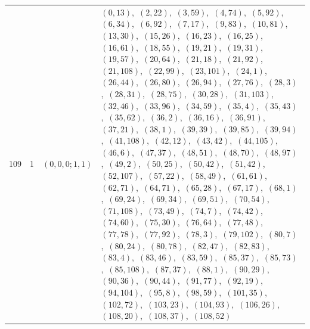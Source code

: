 \documentclass[11pt]{article}
\begin{document}
\begin{longtable}{@{}rrl>{\raggedright\arraybackslash}p{}@{}}
109 & 1 & $(0,0,0;1,1)$ & $(0,13)$,\allowbreak\ $(2,22)$,\allowbreak\ $(3,59)$,\allowbreak\ $(4,74)$,\allowbreak\ $(5,92)$,\allowbreak\ $(6,34)$,\allowbreak\ $(6,92)$,\allowbreak\ $(7,17)$,\allowbreak\ $(9,83)$,\allowbreak\ $(10,81)$,\allowbreak\ $(13,30)$,\allowbreak\ $(15,26)$,\allowbreak\ $(16,23)$,\allowbreak\ $(16,25)$,\allowbreak\ $(16,61)$,\allowbreak\ $(18,55)$,\allowbreak\ $(19,21)$,\allowbreak\ $(19,31)$,\allowbreak\ $(19,57)$,\allowbreak\ $(20,64)$,\allowbreak\ $(21,18)$,\allowbreak\ $(21,92)$,\allowbreak\ $(21,108)$,\allowbreak\ $(22,99)$,\allowbreak\ $(23,101)$,\allowbreak\ $(24,1)$,\allowbreak\ $(26,44)$,\allowbreak\ $(26,80)$,\allowbreak\ $(26,94)$,\allowbreak\ $(27,76)$,\allowbreak\ $(28,3)$,\allowbreak\ $(28,31)$,\allowbreak\ $(28,75)$,\allowbreak\ $(30,28)$,\allowbreak\ $(31,103)$,\allowbreak\ $(32,46)$,\allowbreak\ $(33,96)$,\allowbreak\ $(34,59)$,\allowbreak\ $(35,4)$,\allowbreak\ $(35,43)$,\allowbreak\ $(35,62)$,\allowbreak\ $(36,2)$,\allowbreak\ $(36,16)$,\allowbreak\ $(36,91)$,\allowbreak\ $(37,21)$,\allowbreak\ $(38,1)$,\allowbreak\ $(39,39)$,\allowbreak\ $(39,85)$,\allowbreak\ $(39,94)$,\allowbreak\ $(41,108)$,\allowbreak\ $(42,12)$,\allowbreak\ $(43,42)$,\allowbreak\ $(44,105)$,\allowbreak\ $(46,6)$,\allowbreak\ $(47,37)$,\allowbreak\ $(48,51)$,\allowbreak\ $(48,70)$,\allowbreak\ $(48,97)$,\allowbreak\ $(49,2)$,\allowbreak\ $(50,25)$,\allowbreak\ $(50,42)$,\allowbreak\ $(51,42)$,\allowbreak\ $(52,107)$,\allowbreak\ $(57,22)$,\allowbreak\ $(58,49)$,\allowbreak\ $(61,61)$,\allowbreak\ $(62,71)$,\allowbreak\ $(64,71)$,\allowbreak\ $(65,28)$,\allowbreak\ $(67,17)$,\allowbreak\ $(68,1)$,\allowbreak\ $(69,24)$,\allowbreak\ $(69,34)$,\allowbreak\ $(69,51)$,\allowbreak\ $(70,54)$,\allowbreak\ $(71,108)$,\allowbreak\ $(73,49)$,\allowbreak\ $(74,7)$,\allowbreak\ $(74,42)$,\allowbreak\ $(74,60)$,\allowbreak\ $(75,30)$,\allowbreak\ $(76,64)$,\allowbreak\ $(77,48)$,\allowbreak\ $(77,78)$,\allowbreak\ $(77,92)$,\allowbreak\ $(78,3)$,\allowbreak\ $(79,102)$,\allowbreak\ $(80,7)$,\allowbreak\ $(80,24)$,\allowbreak\ $(80,78)$,\allowbreak\ $(82,47)$,\allowbreak\ $(82,83)$,\allowbreak\ $(83,4)$,\allowbreak\ $(83,46)$,\allowbreak\ $(83,59)$,\allowbreak\ $(85,37)$,\allowbreak\ $(85,73)$,\allowbreak\ $(85,108)$,\allowbreak\ $(87,37)$,\allowbreak\ $(88,1)$,\allowbreak\ $(90,29)$,\allowbreak\ $(90,36)$,\allowbreak\ $(90,44)$,\allowbreak\ $(91,77)$,\allowbreak\ $(92,19)$,\allowbreak\ $(94,104)$,\allowbreak\ $(95,8)$,\allowbreak\ $(98,59)$,\allowbreak\ $(101,35)$,\allowbreak\ $(102,72)$,\allowbreak\ $(103,23)$,\allowbreak\ $(104,93)$,\allowbreak\ $(106,26)$,\allowbreak\ $(108,20)$,\allowbreak\ $(108,37)$,\allowbreak\ $(108,52)$\\

\end{longtable}
\end{document}
